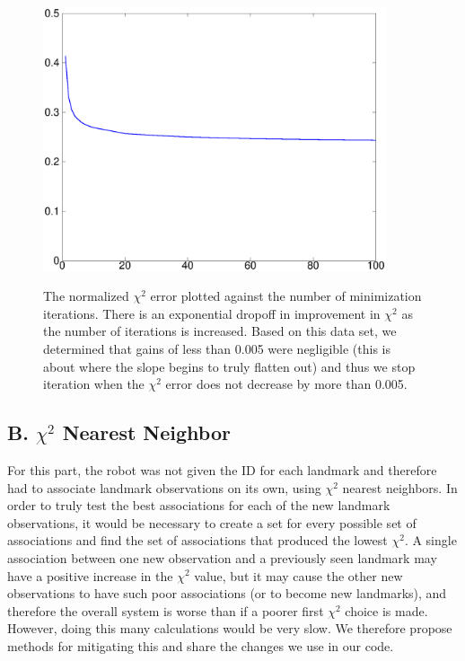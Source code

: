 \documentclass[12pt]{article}
\begin{document}
\begin{figure}[h!]
\centering
\includegraphics[width=0.9\textwidth]{figures/chi2_iters.eps}
\label{fig:chi2_iters}
\caption{The normalized $\chi^2$ error plotted against the number of minimization iterations.
    There is an exponential dropoff in improvement in $\chi^2$ as the number of iterations is
    increased. Based on this data set, we determined that gains of less than 0.005 were
    negligible (this is about where the slope begins to truly flatten out) and thus we stop
    iteration when the $\chi^2$ error does not decrease by more than 0.005.}
\end{figure}


\subsection*{B. $\chi^2$ Nearest Neighbor}

For this part, the robot was not given the ID for each landmark and therefore had to associate landmark observations on its own, using $\chi^2$ nearest neighbors.  In order to truly test the best associations for each of the new landmark observations, it would be necessary to create a set for every possible set of associations and find the set of associations that produced the lowest $\chi^2$.  A single association between one new observation and a previously seen landmark may have a positive increase in the $\chi^2$ value, but it may cause the other new observations to have such poor associations (or to become new landmarks), and therefore the overall system is worse than if a poorer first $\chi^2$ choice is made.  However, doing this many calculations would be very slow.  We therefore propose methods for mitigating this and share the changes we use in our code.
\end{document}
